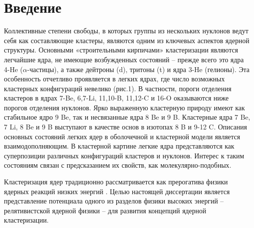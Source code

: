 \documentclass[fontsize=14pt]{scrarticle}
\begin{document}
\section*{Введение}
\hspace{0.6cm}
Коллективные степени свободы, в которых группы из нескольких нуклонов ведут себя как составляющие кластеры, являются одним из ключевых аспектов ядерной структуры. Основными «строительными кирпичами» кластеризации являются легчайшие ядра, не имеющие возбужденных состояний – прежде всего это ядра 4-He ($\alpha$-частицы), а также дейтроны (d), тритоны (t) и ядра 3-He (гелионы). Эта особенность отчетливо проявляется в легких ядрах, где число возможных кластерных конфигураций невелико (рис.1). В частности, пороги отделения кластеров в ядрах 7-Be, 6,7-Li, 11,10-B, 11,12-C и 16-O оказываются ниже порогов отделения нуклонов. Ярко выраженную кластерную природу имеют как стабильное ядро 9 Be, так и несвязанные ядра 8 Be и 9 B. Кластерные ядра 7 Be, 7 Li, 8 Be и 9 B выступают в качестве основ в изотопах 8 B и 9-12 C. Описания основных состояний легких ядер в оболочечной и кластерной модели является взаимодополняющим. В кластерной картине легкие ядра представляются как суперпозиции различных конфигураций кластеров и нуклонов. Интерес к таким состояниям связан с предсказанием их свойств, как молекулярно-подобных\cite{1,2}.
	
    Кластеризация ядер традиционно рассматривается как прерогатива физики ядерных реакций низких энергий \cite{3}. Целью настоящей диссертации является представление потенциала одного из разделов физики высоких энергий – релятивистской ядерной физики – для развития концепций ядерной кластеризации. 
\end{document}
